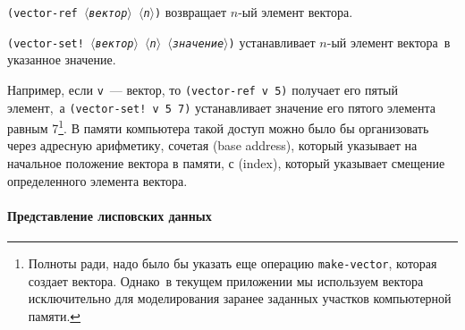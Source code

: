 \begin{plainlist}


\item
{} 
{\tt (vector-ref \textit{$\langle$вектор$\rangle$} 
\textit{$\langle$n$\rangle$})} возвращает $n$-ый элемент
вектора.

\item
\sloppy
{} 
{\tt (vector-set! \textit{$\langle$вектор$\rangle$}  
\textit{$\langle$n$\rangle$} \textit{$\langle$значение$\rangle$})} устанавливает
$n$-ый элемент вектора~в указанное значение.
\end{plainlist}
Например, если {\tt v}~--- вектор, то {\tt (vector-ref
v 5)} получает его пятый элемент,~а {\tt (vector-set! v 5
7)} устанавливает значение его пятого элемента равным 7\footnote{Полноты ради, надо было бы указать еще операцию
{\tt make-vector}, которая создает вектора.  Однако~в текущем
приложении мы используем вектора исключительно для моделирования
заранее заданных участков компьютерной памяти.
}.
В памяти компьютера такой доступ можно было бы организовать через
адресную арифметику, сочетая  (base address), который указывает на начальное положение вектора в
памяти, с  (index), который указывает
смещение определенного элемента вектора.

\paragraph{Представление лисповских данных}


